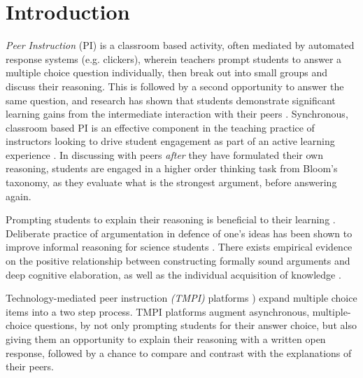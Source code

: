 \documentclass[notitlepage,12pt]{jedm}
\begin{document}
\section{Introduction}

\textit{Peer Instruction} (PI) is a classroom based activity, often mediated by 
automated response systems (e.g. clickers), wherein teachers prompt students to 
answer a multiple choice question individually, then break out into small 
groups and discuss their reasoning.
This is followed by a second opportunity to answer the same question, and 
research has shown that students demonstrate significant learning gains from 
the intermediate interaction with their peers \cite{crouch_peer_2001}.
Synchronous, classroom based PI is an effective component in the teaching 
practice of instructors looking to drive student engagement as part of an 
active learning experience \cite{charles_beyond_2015}. 
In discussing with peers \textit{after} they have formulated their own 
reasoning, students are engaged in a higher order thinking task from Bloom's 
taxonomy, as they evaluate what is the strongest argument, before answering 
again.

Prompting students to explain their reasoning is beneficial to their learning 
\cite{chi_eliciting_1994}. 
Deliberate practice of argumentation in defence of one's ideas has been shown 
to improve informal reasoning for science students \cite{venville_impact_2010}.
There exists empirical evidence on the positive relationship between 
constructing formally sound arguments and deep cognitive elaboration, as well 
as the individual acquisition of knowledge \cite{stegmann_collaborative_2012}.

Technology-mediated peer instruction \textit{(TMPI)} platforms 
\cite{charles_harnessing_2019,university_of_british_columbia_ubc/ubcpi_2019})
expand multiple choice items into a two step process.
TMPI platforms augment asynchronous, multiple-choice questions, by not only 
prompting students for their answer choice, but also giving them an opportunity 
to explain their reasoning with a written open response, followed by a chance 
to compare and contrast with the explanations of their peers.
\end{document}
